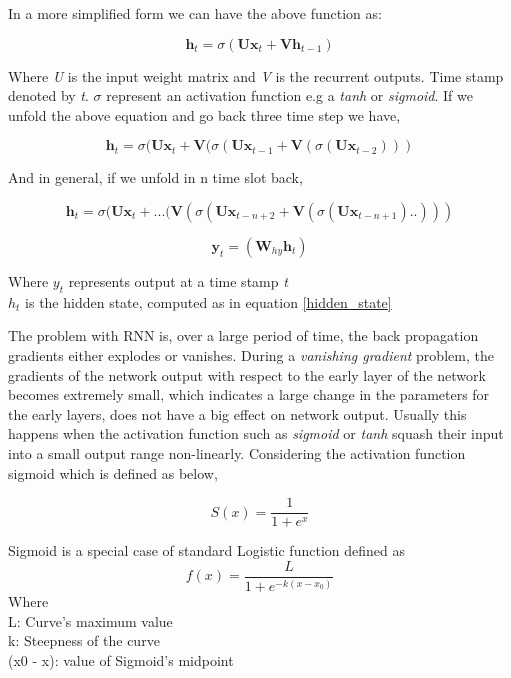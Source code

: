 In a more simplified form we can have the above function as:

\begin{equation}\label{hidden_state}
	\textbf{h}_t = \sigma (\textbf{Ux}_t + \textbf{Vh}_{t-1}) 
\end{equation}

Where \textit{U} is the input weight matrix and \textit{V} is the recurrent outputs. Time stamp denoted by \textit{t}. $\sigma$ represent an activation function e.g a \textit{tanh} or \textit{sigmoid}. If we unfold the above equation and go back three time step we have,

\begin{equation}
	\textbf{h}_t = \sigma (\textbf{Ux}_t + \textbf{V}(\sigma(\textbf{Ux}_{t-1} + \textbf{V}(\sigma(\textbf{Ux}_{t-2})))
\end{equation}

And in general, if we unfold in n time slot back,

\begin{equation}
\textbf{h}_t = \sigma (\textbf{Ux}_t + ...( \textbf{V}(\sigma(\textbf{Ux}_{t-n+2} + \textbf{V}(\sigma(\textbf{Ux}_{t-n+1})..)))
\end{equation}

\begin{equation}
	\textbf{y}_t = (\textbf{W}_{hy}  \textbf{h}_{t}) 
\end{equation}

Where \textbf{$y_t$}  represents output at a time stamp \textit{t} \\
\textbf{$h_t$} is the hidden state, computed as in equation \ref{hidden_state}

The problem with RNN is, over a large period of time, the back propagation gradients either explodes or vanishes. During a \textit{vanishing gradient } problem, the gradients of the network output with respect to the early layer of the network becomes extremely small, which indicates a large change in the parameters for the early layers, does not have a big effect on network output. Usually this happens when the activation function such as \textit{sigmoid} or \textit{tanh} squash their input into a small output range non-linearly. Considering the activation function sigmoid which is defined as below,

\begin{equation}
	S(x) = \frac{1}{ 1+ e^x}
\end{equation}

Sigmoid is a special case of standard Logistic function defined as 
\begin{equation}
f(x) = \frac{L}{ 1+ e^{-k(x-x_0)}}
\end{equation}
Where \\
L: Curve's maximum value \\
k: Steepness of the curve \\
(x0 - x): value of Sigmoid's midpoint \\

